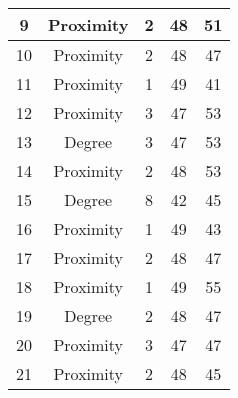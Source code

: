 \documentclass[results.tex]{subfiles}
\begin{document}
\begin{center}
\begin{tabular}{| c || c | c | c | c |}
            \hline
            9                       & Proximity                    & 2                      & 48                      & 51                   \\
            \hline
            10                      & Proximity                    & 2                      & 48                      & 47                   \\
            \hline
            11                      & Proximity                    & 1                      & 49                      & 41                   \\
            \hline
            12                      & Proximity                    & 3                      & 47                      & 53                   \\
            \hline
            13                      & Degree                       & 3                      & 47                      & 53                   \\
            \hline
            14                      & Proximity                    & 2                      & 48                      & 53                   \\
            \hline
            15                      & Degree                       & 8                      & 42                      & 45                   \\
            \hline
            16                      & Proximity                    & 1                      & 49                      & 43                   \\
            \hline
            17                      & Proximity                    & 2                      & 48                      & 47                   \\
            \hline
            18                      & Proximity                    & 1                      & 49                      & 55                   \\
            \hline
            19                      & Degree                       & 2                      & 48                      & 47                   \\
            \hline
            20                      & Proximity                    & 3                      & 47                      & 47                   \\
            \hline
            21                      & Proximity                    & 2                      & 48                      & 45                   \\

\end{tabular}
\end{center}
\end{document}
